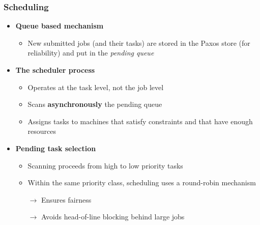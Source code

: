 \begin{frame}
\frametitle{Scheduling}
\begin{itemize}
	\item {\bf Queue based mechanism}
	\begin{itemize}
		\item New submitted jobs (and their tasks) are stored in the Paxos store (for reliability) and put in the {\it pending queue}
	\end{itemize}
	\item {\bf The scheduler process}
	\begin{itemize}
		\item {\color{red} Operates at the task level, not the job level}
		\item Scans {\bf asynchronously} the pending queue
		\item Assigns tasks to machines that satisfy constraints and that have enough resources
	\end{itemize}
	\item {\bf Pending task selection}
	\begin{itemize}
		\item Scanning proceeds from high to low priority tasks
		\item Within the same priority class, scheduling uses a round-robin mechanism
		\item[$\to$] Ensures fairness
		\item[$\to$] Avoids head-of-line blocking behind large jobs
	\end{itemize}
\end{itemize}
\end{frame}

